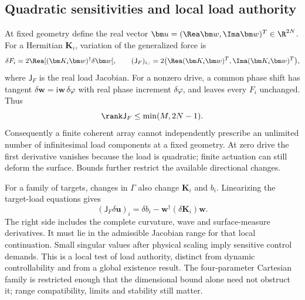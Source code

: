 \subsection{Quadratic sensitivities and local load authority}
At fixed geometry define the real vector
$\bm u=(\Rea\bm w,\Ima\bm w)^T\in\R^{2N}$. For a Hermitian $\bm K_i$,
variation of the generalized force is
\begin{equation}
 \delta F_i=2\Rea[(\bm K_i\bm w)^\dagger\delta\bm w],\qquad
 (\mathsf J_F)_{i,:}
    =2\big(\Rea(\bm K_i\bm w)^T,\Ima(\bm K_i\bm w)^T\big),
 \label{eq:quadratic-jacobian}
\end{equation}
where $\mathsf J_F$ is the real load Jacobian. For a nonzero drive, a common
phase shift has tangent $\delta\bm w=\mathrm i\bm w\,\delta\varphi$ with
real phase increment $\delta\varphi$, and leaves every $F_i$ unchanged. Thus
\begin{equation}
 \rank\mathsf J_F\leq\min(M,2N-1).
 \label{eq:local-rank-bound}
\end{equation}
Consequently a finite coherent array cannot independently prescribe an
unlimited number of infinitesimal load components at a fixed geometry. At zero
drive the first derivative vanishes because the load is quadratic; finite
actuation can still deform the surface. Bounds further restrict the available
directional changes.

For a family of targets, changes in $\Gamma$ also change $\bm K_i$ and $b_i$.
Linearizing the target-load equations gives
\begin{equation}
 (\mathsf J_F\delta\bm u)_i
       =\delta b_i-\bm w^\dagger(\delta\bm K_i)\bm w.
 \label{eq:target-to-drive-tangent}
\end{equation}
The right side includes the complete curvature, wave and surface-measure
derivatives. It must lie in the admissible Jacobian range for that local
continuation. Small singular values after physical scaling imply sensitive
control demands. This is a local test of load authority, distinct from
dynamic controllability and from a global existence result. The four-parameter
Cartesian family is restricted enough that the dimensional bound alone need
not obstruct it; range compatibility, limits and stability still matter.

